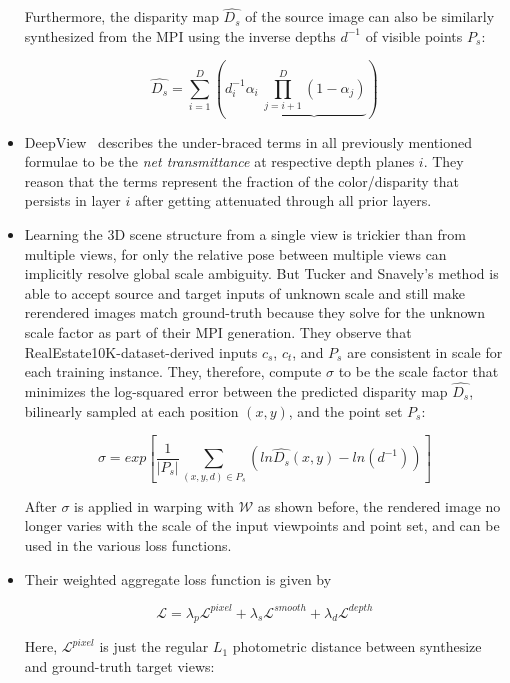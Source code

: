 \begin{itemize}
    Furthermore, the disparity map $\hat{D_s}$ of the source image can also be similarly synthesized from the MPI using the inverse depths $d^{-1}$ of visible points $P_s$:
    
    \begin{equation}\label{eq:disparity-map}
    \hat{D_s} = \sum_{i=1}^D \left(d_i^{-1} \alpha_i\ \underbrace{\prod_{j=i+1}^D (1 - \alpha_j)}\right)
    \end{equation}
    
    \item DeepView~\cite{flynn_deepview_2019} describes the under-braced terms in all previously mentioned formulae to be the \textit{net transmittance} at respective depth planes $i$. They reason that the terms represent the fraction of the color/disparity that persists in layer $i$ after getting attenuated through all prior layers.
    \item Learning the 3D scene structure from a single view is trickier than from multiple views, for only the relative pose between multiple views can implicitly resolve global scale ambiguity. But Tucker and Snavely's method is able to accept source and target inputs of unknown scale and still make rerendered images match ground-truth because they solve for the unknown scale factor as part of their MPI generation. They observe that RealEstate10K-dataset-derived inputs $c_s$, $c_t$, and $P_s$ are consistent in scale for each training instance. They, therefore, compute $\sigma$ to be the scale factor that minimizes the log-squared error between the predicted disparity map $\hat{D_s}$, bilinearly sampled at each position $(x,y)$, and the point set $P_s$:
    
    \[\sigma = exp \left[\frac{1}{|P_s|} \sum_{(x,y,d) \in P_s} (ln \hat{D_s}(x,y) - ln(d^{-1}))\right]\]
    
    After $\sigma$ is applied in warping with $\mathcal{W}$ as shown before, the rendered image no longer varies with the scale of the input viewpoints and point set, and can be used in the various loss functions. 
    \item Their weighted aggregate loss function is given by
    
    \begin{equation}\label{eq:aggregate-loss}
    \mathcal{L} = \lambda_p \mathcal{L}^{pixel} + \lambda_s \mathcal{L}^{smooth} + \lambda_d \mathcal{L}^{depth}
    \end{equation}
    
    Here, $\mathcal{L}^{pixel}$ is just the regular $L_1$ photometric distance between synthesize and ground-truth target views:
    

\end{itemize}
